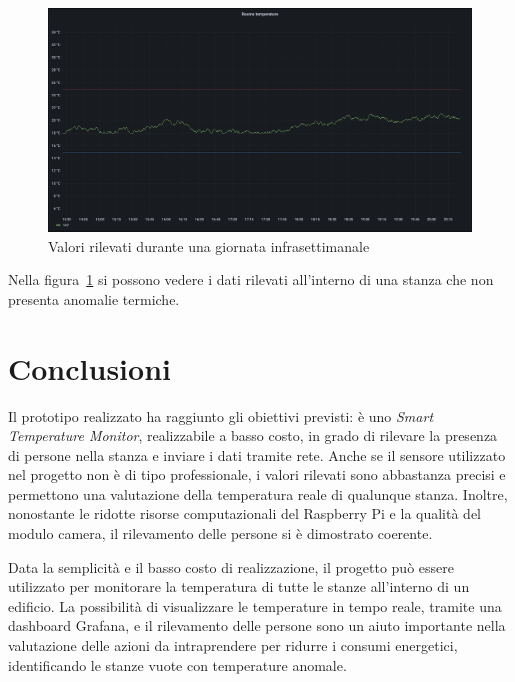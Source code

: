 \documentclass[italian,12pt,a4paper,oneside,final]{report}
\begin{document}
\begin{figure}[h]
	\centering
	\includegraphics[width=1\textwidth]{grafana_room.png}
	\caption{Valori rilevati durante una giornata infrasettimanale}
	\label{fig:grafana_stanza}
\end{figure}

Nella figura~\ref{fig:grafana_stanza} si possono vedere i dati rilevati all'interno di una stanza che non presenta anomalie termiche.

\newpage

\section{Conclusioni}
Il prototipo realizzato ha raggiunto gli obiettivi previsti: è uno \textit{Smart Temperature Monitor}, realizzabile a basso costo, in grado di rilevare la presenza di persone nella stanza e inviare i dati tramite rete.
Anche se il sensore utilizzato nel progetto non è di tipo professionale, i valori rilevati sono abbastanza precisi e permettono una valutazione della temperatura reale di qualunque stanza.
Inoltre, nonostante le ridotte risorse computazionali del Raspberry Pi e la qualità del modulo camera, il rilevamento delle persone si è dimostrato coerente.

Data la semplicità e il basso costo di realizzazione, il progetto può essere utilizzato per monitorare la temperatura di tutte le stanze all'interno di un edificio.
La possibilità di visualizzare le temperature in tempo reale, tramite una dashboard Grafana, e il rilevamento delle persone sono un aiuto importante nella valutazione delle azioni da intraprendere per ridurre i consumi energetici, identificando le stanze vuote con temperature anomale.
\end{document}
